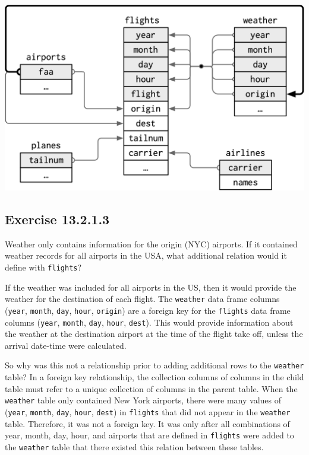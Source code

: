 \documentclass[]{book}
\theoremstyle{plain}
\theoremstyle{remark}
\begin{document}
\begin{center}\includegraphics[width=15.49in]{diagrams/nycflights} \end{center}

\hypertarget{exercise-13.2.1.3}{%
\subsection*{\texorpdfstring{Exercise {13.2.1.3}}{Exercise 13.2.1.3}}\label{exercise-13.2.1.3}}

Weather only contains information for the origin (NYC) airports. If it contained weather records for all airports in the USA, what additional relation would it define with \texttt{flights}?

If the weather was included for all airports in the US, then it would provide the weather for the destination of each flight.
The \texttt{weather} data frame columns (\texttt{year}, \texttt{month}, \texttt{day}, \texttt{hour}, \texttt{origin}) are a foreign key for the \texttt{flights} data frame columns (\texttt{year}, \texttt{month}, \texttt{day}, \texttt{hour}, \texttt{dest}).
This would provide information about the weather at the destination airport at the time of the flight take off, unless the arrival date-time were calculated.

So why was this not a relationship prior to adding additional rows to the \texttt{weather} table?
In a foreign key relationship, the collection columns of columns in the child table
must refer to a unique collection of columns in the parent table.
When the \texttt{weather} table only contained New York airports,
there were many values of (\texttt{year}, \texttt{month}, \texttt{day}, \texttt{hour}, \texttt{dest}) in \texttt{flights} that
did not appear in the \texttt{weather} table. Therefore, it was not a foreign key. It was only after
all combinations of year, month, day, hour, and airports that are defined in \texttt{flights}
were added to the \texttt{weather} table that there existed this relation between these tables.
\end{document}
